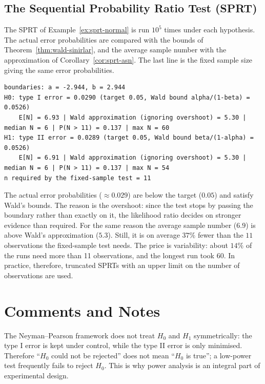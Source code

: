 \documentclass[main.tex]{subfiles}
\begin{document}
\subsection{The Sequential Probability Ratio Test (SPRT)}
The SPRT of Example~\ref{ex:sprt-normal} is run $10^5$ times under each hypothesis. The actual error probabilities are compared with the bounds of Theorem~\ref{thm:wald-sinirlar}, and the average sample number with the approximation of Corollary~\ref{cor:sprt-asn}. The last line is the fixed sample size giving the same error probabilities.

\begin{lstlisting}[style=output]
boundaries: a = -2.944, b = 2.944
H0: type I error = 0.0290 (target 0.05, Wald bound alpha/(1-beta) = 0.0526)
    E[N] = 6.93 | Wald approximation (ignoring overshoot) = 5.30 | median N = 6 | P(N > 11) = 0.137 | max N = 60
H1: type II error = 0.0289 (target 0.05, Wald bound beta/(1-alpha) = 0.0526)
    E[N] = 6.91 | Wald approximation (ignoring overshoot) = 5.30 | median N = 6 | P(N > 11) = 0.137 | max N = 54
n required by the fixed-sample test = 11
\end{lstlisting}

The actual error probabilities ($\approx0.029$) are below the target ($0.05$) and satisfy Wald's bounds. The reason is the overshoot: since the test stops by passing the boundary rather than exactly on it, the likelihood ratio decides on stronger evidence than required. For the same reason the average sample number ($6.9$) is above Wald's approximation ($5.3$). Still, it is on average $37\%$ fewer than the $11$ observations the fixed-sample test needs. The price is variability: about $14\%$ of the runs need more than 11 observations, and the longest run took 60. In practice, therefore, truncated SPRTs with an upper limit on the number of observations are used.

\section{Comments and Notes}

\begin{remark}
The Neyman--Pearson framework does not treat $H_0$ and $H_1$ symmetrically: the type I error is kept under control, while the type II error is only minimised. Therefore ``$H_0$ could not be rejected'' does not mean ``$H_0$ is true''; a low-power test frequently fails to reject $H_0$. This is why power analysis is an integral part of experimental design.
\end{remark}
\end{document}
